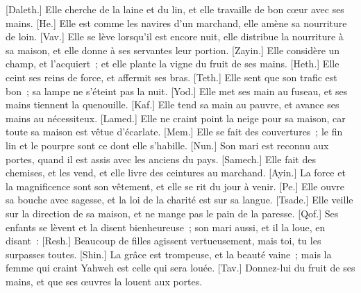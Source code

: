 \begin{multicols}{2}
[Daleth.] Elle cherche de la laine et du lin, et elle travaille de bon cœur avec ses mains.
[He.] Elle est comme les navires d'un marchand, elle amène sa nourriture de loin.
[Vav.] Elle se lève lorsqu'il est encore nuit, elle distribue la nourriture à sa maison, et elle donne à ses servantes leur portion.
[Zayin.] Elle considère un champ, et l'acquiert~; et elle plante la vigne du fruit de ses mains.
[Heth.] Elle ceint ses reins de force, et affermit ses bras.
[Teth.] Elle sent que son trafic est bon~; sa lampe ne s'éteint pas la nuit.
[Yod.] Elle met ses main au fuseau, et ses mains tiennent la quenouille.
[Kaf.] Elle tend sa main au pauvre, et avance ses mains au nécessiteux.
[Lamed.] Elle ne craint point la neige pour sa maison, car toute sa maison est vêtue d'écarlate.
[Mem.] Elle se fait des couvertures~; le fin lin et le pourpre sont ce dont elle s'habille.
[Nun.] Son mari est reconnu aux portes, quand il est assis avec les anciens du pays.
[Samech.] Elle fait des chemises, et les vend, et elle livre des ceintures au marchand.
[Ayin.] La force et la magnificence sont son vêtement, et elle se rit du jour à venir.
[Pe.] Elle ouvre sa bouche avec sagesse, et la loi de la charité est sur sa langue.
[Tsade.] Elle veille sur la direction de sa maison, et ne mange pas le pain de la paresse.
[Qof.] Ses enfants se lèvent et la disent bienheureuse~; son mari aussi, et il la loue, en disant~:
[Resh.] Beaucoup de filles agissent vertueusement, mais toi, tu les surpasses toutes.
[Shin.] La grâce est trompeuse, et la beauté vaine~; mais la femme qui craint Yahweh est celle qui sera louée.
[Tav.] Donnez-lui du fruit de ses mains, et que ses œuvres la louent aux portes.
\PPE{}
\end{multicols}
